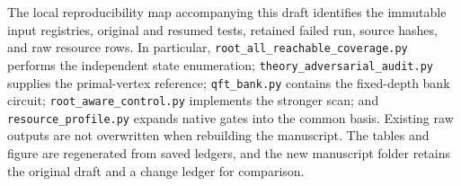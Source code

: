 \documentclass[referee,pdflatex,sn-mathphys-num]{sn-jnl}
\theoremstyle{thmstyleone}
\theoremstyle{thmstyletwo}
\begin{document}
The local reproducibility map accompanying this draft identifies the immutable input registries, original and resumed tests, retained failed run, source hashes, and raw resource rows. In particular, \texttt{root\_all\_reachable\_coverage.py} performs the independent state enumeration; \texttt{theory\_adversarial\_audit.py} supplies the primal-vertex reference; \texttt{qft\_bank.py} contains the fixed-depth bank circuit; \texttt{root\_aware\_control.py} implements the stronger scan; and \texttt{resource\_profile.py} expands native gates into the common basis. Existing raw outputs are not overwritten when rebuilding the manuscript. The tables and figure are regenerated from saved ledgers, and the new manuscript folder retains the original draft and a change ledger for comparison.


\end{document}
